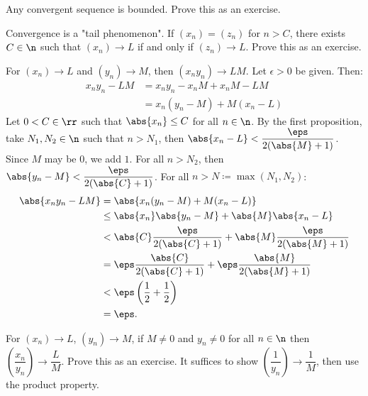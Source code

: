 

\begin{proposition}{
    Any convergent sequence is bounded.\label{thm:2.3.2}
}
    Prove this as an exercise.
\end{proposition}

\begin{proposition}{
    Convergence is a "tail phenomenon".
    If $(x_n) = (z_n)$ for $n > C$, there exists $C\in\n$ such that $(x_n)\to L$ if and only if $(z_n)\to L$.
}
    Prove this as an exercise.
\end{proposition}

\begin{proposition}{
    For $(x_n)\to L$ and $(y_n)\to M$, then $(x_{n}y_n)\to LM$.
}
    Let $\epsilon > 0$ be given.
    Then:
    \begin{align*}
        x_{n}y_n - LM &= x_{n}y_n - x_{n}M + x_{n}M - LM\\
        &= x_n(y_n - M) + M(x_n - L)
    \end{align*}
    Let $0 < C\in\rr$ such that $\abs{x_n}\leq C$ for all $n\in\n$.
    By the first proposition, take $N_1,N_2\in\n$ such that $n > N_1$, then $\abs{x_n - L} < \dfrac{\eps}{2(\abs{M} + 1)}$.
    Since $M$ may be $0$, we add $1$.
    For all $n > N_2$, then $\abs{y_n - M} < \dfrac{\eps}{2(\abs{C} + 1)}$.
    For all $n > N \coloneqq \max(N_1,N_2)$:
    \begin{align*}
        \abs{x_{n}y_n - LM} &= \abs{x_n(y_n - M) + M(x_n - L)}\\
        &\leq \abs{x_n}\abs{y_n - M} + \abs{M}\abs{x_n - L}\\
        &< \abs{C}\dfrac{\eps}{2(\abs{C} + 1)} + \abs{M}\dfrac{\eps}{2(\abs{M} + 1)}\\
        &= \eps\dfrac{\abs{C}}{2(\abs{C} + 1)} + \eps\dfrac{\abs{M}}{2(\abs{M} + 1)}\\
        &< \eps\left(\dfrac{1}{2} + \dfrac{1}{2}\right)\\
        &= \eps.
    \end{align*}
\end{proposition}

\begin{proposition}{
    For $(x_n)\to L$, $(y_n)\to M$, if $M\neq 0$ and $y_n\neq 0$ for all $n\in\n$ then $\left(\dfrac{x_n}{y_n}\right)\to \dfrac{L}{M}$.
}
    Prove this as an exercise.
    It suffices to show $\left(\dfrac{1}{y_n}\right)\to\dfrac{1}{M}$, then use the product property.
\end{proposition}

